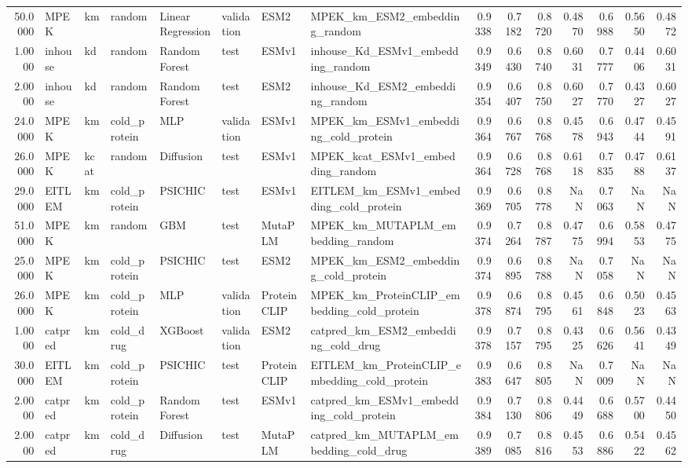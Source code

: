 \begin{tabular}{rlllllllrrrrrrr}
50.0000 & MPEK & km & random & Linear Regression & validation & ESM2 & MPEK_km_ESM2_embedding_random & 0.9338 & 0.7182 & 0.8720 & 0.4870 & 0.6988 & 0.5650 & 0.4872 \\
1.0000 & inhouse & kd & random & Random Forest & test & ESMv1 & inhouse_Kd_ESMv1_embedding_random & 0.9349 & 0.6430 & 0.8740 & 0.6031 & 0.7777 & 0.4406 & 0.6031 \\
2.0000 & inhouse & kd & random & Random Forest & test & ESM2 & inhouse_Kd_ESM2_embedding_random & 0.9354 & 0.6407 & 0.8750 & 0.6027 & 0.7770 & 0.4327 & 0.6027 \\
24.0000 & MPEK & km & cold_protein & MLP & validation & ESMv1 & MPEK_km_ESMv1_embedding_cold_protein & 0.9364 & 0.6767 & 0.8768 & 0.4578 & 0.6943 & 0.4744 & 0.4591 \\
26.0000 & MPEK & kcat & random & Diffusion & test & ESMv1 & MPEK_kcat_ESMv1_embedding_random & 0.9364 & 0.6728 & 0.8768 & 0.6118 & 0.7835 & 0.4788 & 0.6137 \\
29.0000 & EITLEM & km & cold_protein & PSICHIC & test & ESMv1 & EITLEM_km_ESMv1_embedding_cold_protein & 0.9369 & 0.6705 & 0.8778 & NaN & 0.7063 & NaN & NaN \\
51.0000 & MPEK & km & random & GBM & test & MutaPLM & MPEK_km_MUTAPLM_embedding_random & 0.9374 & 0.7264 & 0.8787 & 0.4775 & 0.6994 & 0.5853 & 0.4775 \\
25.0000 & MPEK & km & cold_protein & PSICHIC & test & ESM2 & MPEK_km_ESM2_embedding_cold_protein & 0.9374 & 0.6895 & 0.8788 & NaN & 0.7058 & NaN & NaN \\
26.0000 & MPEK & km & cold_protein & MLP & validation & ProteinCLIP & MPEK_km_ProteinCLIP_embedding_cold_protein & 0.9378 & 0.6874 & 0.8795 & 0.4561 & 0.6848 & 0.5023 & 0.4563 \\
1.0000 & catpred & km & cold_drug & XGBoost & validation & ESM2 & catpred_km_ESM2_embedding_cold_drug & 0.9378 & 0.7157 & 0.8795 & 0.4325 & 0.6626 & 0.5641 & 0.4349 \\
30.0000 & EITLEM & km & cold_protein & PSICHIC & test & ProteinCLIP & EITLEM_km_ProteinCLIP_embedding_cold_protein & 0.9383 & 0.6647 & 0.8805 & NaN & 0.7009 & NaN & NaN \\
2.0000 & catpred & km & cold_protein & Random Forest & test & ESMv1 & catpred_km_ESMv1_embedding_cold_protein & 0.9384 & 0.7130 & 0.8806 & 0.4449 & 0.6688 & 0.5700 & 0.4450 \\
2.0000 & catpred & km & cold_drug & Diffusion & test & MutaPLM & catpred_km_MUTAPLM_embedding_cold_drug & 0.9389 & 0.7085 & 0.8816 & 0.4553 & 0.6886 & 0.5422 & 0.4562 \\

\end{tabular}
